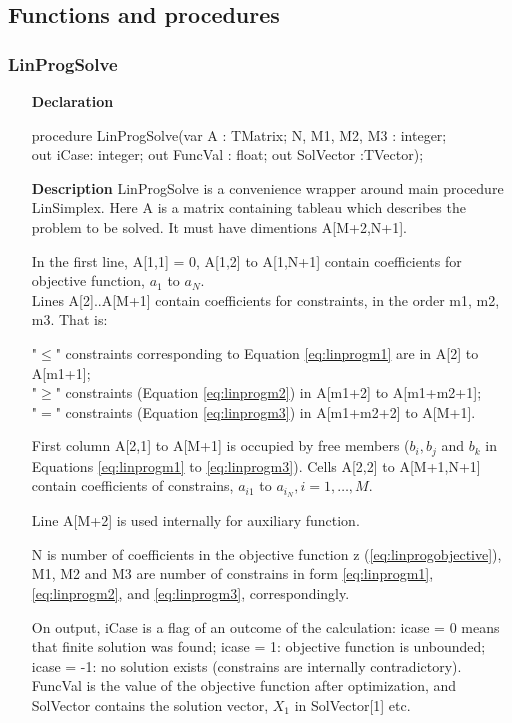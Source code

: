 \documentclass[12pt,a4paper,oneside]{report}
\newcommand{\declarationitem}[1]{\textbf{#1}}
\newcommand{\descriptiontitle}[1]{\textbf{#1}}
\begin{document}
\subsection{Functions and procedures}
\subsubsection{LinProgSolve}
\label{linprog:LinProgSolve}
\begin{itemize}
	\item[\declarationitem{Declaration}\hfill]
	\begin{flushleft}
procedure LinProgSolve(var A : TMatrix; N, M1, M2, M3 : integer;\\
out iCase: integer; out FuncVal : float; out SolVector :TVector);
	\end{flushleft}
	\item[\descriptiontitle{Description}\hfill]
	LinProgSolve is a convenience wrapper around main procedure LinSimplex. Here A is a matrix containing tableau which describes the problem to be solved. It must have dimentions A[M+2,N+1]. 
	
	In the first line, A[1,1] = 0, A[1,2] to A[1,N+1] contain  coefficients for objective function, $a_1$ to $a_N$.\\
	Lines A[2]..A[M+1] contain coefficients for constraints, in the order m1, m2, m3. That is:
	
	"$\leq$" constraints corresponding to Equation \ref{eq:linprogm1} are in A[2] to A[m1+1];\\
	"$\geq$" constraints (Equation \ref{eq:linprogm2}) in A[m1+2] to A[m1+m2+1];\\
	"$=$" constraints (Equation \ref{eq:linprogm3})    in A[m1+m2+2] to A[M+1].
	
	First column A[2,1] to A[M+1] is occupied by free members ($b_i,b_j$ and $b_k$ in Equations \ref{eq:linprogm1} to \ref{eq:linprogm3}). Cells A[2,2] to A[M+1,N+1] contain coefficients of constrains, $a_{i1}$ to $a_{i_N}, i=1,\dots,M$.

	Line A[M+2] is used internally for auxiliary function. 
	
	N is number of coefficients in the objective function z (\ref{eq:linprogobjective}), M1, M2 and M3 are number of constrains in form \ref{eq:linprogm1}, \ref{eq:linprogm2}, and \ref{eq:linprogm3}, correspondingly. 
	
	On output, iCase is a flag of an outcome of the calculation: icase = 0 means that finite solution was found; icase = 1: objective function is unbounded;	icase = -1: no solution exists (constrains are internally contradictory). FuncVal is the value of the objective function after optimization, and SolVector contains the solution vector, $X_1$ in SolVector[1] etc.
\end{itemize}
\end{document}
